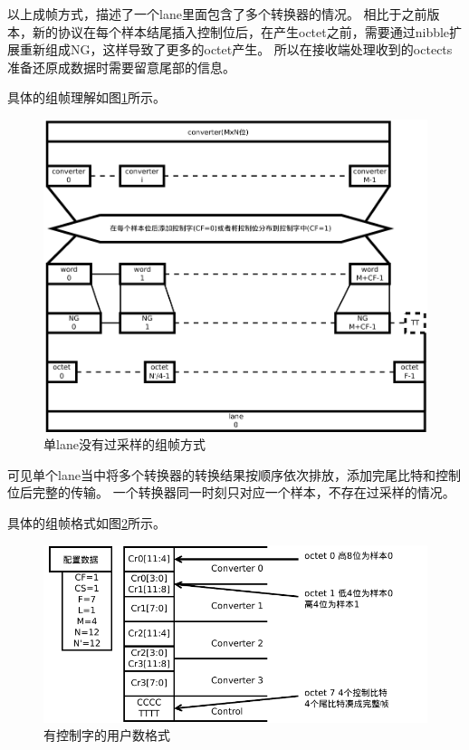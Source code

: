 \documentclass[UTF8]{ctexart}
\begin{document}
以上成帧方式，描述了一个lane里面包含了多个转换器的情况。
相比于之前版本，新的协议在每个样本结尾插入控制位后，在产生octet之前，需要通过nibble扩展重新组成NG，这样导致了更多的octet产生。
所以在接收端处理收到的octects准备还原成数据时需要留意尾部的信息。

具体的组帧理解如图\ref{fig:user_data_format_for_lane_non_oversample}所示。

\begin{figure}[H]
	\centering
	\includegraphics[width=16cm]{./img/user_data_format_for_lane_non_oversample.pdf}
	\caption{单lane没有过采样的组帧方式}
	\label{fig:user_data_format_for_lane_non_oversample}
\end{figure}

可见单个lane当中将多个转换器的转换结果按顺序依次排放，添加完尾比特和控制位后完整的传输。
一个转换器同一时刻只对应一个样本，不存在过采样的情况。

具体的组帧格式如图\ref{fig:user_data_format_with_control_word}所示。

\begin{figure}[H]
	\centering
	\includegraphics[width=16cm]{./img/user_data_format_with_control_word.pdf}
	\caption{有控制字的用户数格式}
	\label{fig:user_data_format_with_control_word}
\end{figure}
\end{document}
